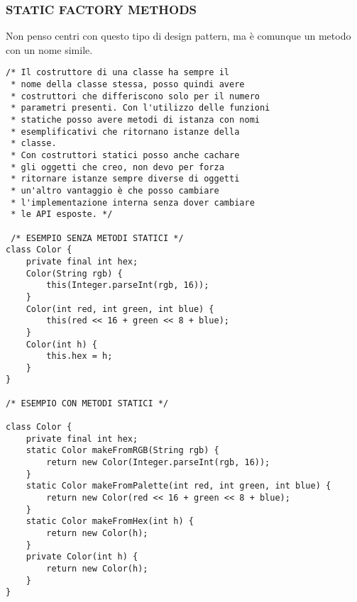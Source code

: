 \subsubsection{STATIC FACTORY METHODS}
\noindent Non penso centri con questo tipo di design pattern, ma è comunque un metodo con un nome simile.
\begin{lstlisting}
/* Il costruttore di una classe ha sempre il 
 * nome della classe stessa, posso quindi avere
 * costruttori che differiscono solo per il numero
 * parametri presenti. Con l'utilizzo delle funzioni 
 * statiche posso avere metodi di istanza con nomi 
 * esemplificativi che ritornano istanze della 
 * classe. 
 * Con costruttori statici posso anche cachare 
 * gli oggetti che creo, non devo per forza
 * ritornare istanze sempre diverse di oggetti
 * un'altro vantaggio è che posso cambiare 
 * l'implementazione interna senza dover cambiare
 * le API esposte. */
 
 /* ESEMPIO SENZA METODI STATICI */
class Color {
    private final int hex;
    Color(String rgb) {
        this(Integer.parseInt(rgb, 16));
    }
    Color(int red, int green, int blue) {
        this(red << 16 + green << 8 + blue);
    }
    Color(int h) {
        this.hex = h;
    }
}

/* ESEMPIO CON METODI STATICI */

class Color {
    private final int hex;
    static Color makeFromRGB(String rgb) {
        return new Color(Integer.parseInt(rgb, 16));
    }
    static Color makeFromPalette(int red, int green, int blue) {
        return new Color(red << 16 + green << 8 + blue);
    }
    static Color makeFromHex(int h) {
        return new Color(h);
    }
    private Color(int h) {
        return new Color(h);
    }
} 

\end{lstlisting}
